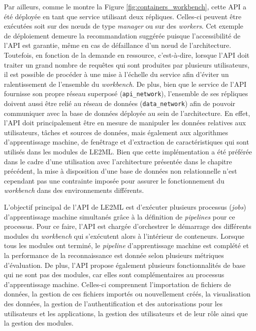 Par ailleurs, comme le montre la Figure \ref{fig:containers_workbench}, cette \acs{API} a été déployée en tant que service utilisant deux répliques. Celles-ci peuvent être exécutées soit sur des n\oe{}uds de type \textit{manager} ou sur des \textit{workers}. Cet exemple de déploiement demeure la recommandation suggérée puisque l'accessibilité de l'\acs{API} est garantie, même en cas de défaillance d'un n\oe{}ud de l'architecture. Toutefois, en fonction de la demande en ressource, c'est-à-dire, lorsque l'\acs{API} doit traiter un grand nombre de requêtes qui sont produites par plusieurs utilisateurs, il est possible de procéder à une mise à l'échelle du service afin d'éviter un ralentissement de l'ensemble du \textit{workbench}. De plus, bien que le service de l'\acs{API} fournisse son propre réseau superposé (\texttt{api\_network}), l'ensemble de ses répliques doivent aussi être relié au réseau de données (\texttt{data\_network}) afin de pouvoir communiquer avec la base de données déployée au sein de l'architecture. En effet, l'\acs{API} doit principalement être en mesure de manipuler les données relatives aux utilisateurs, tâches et sources de données, mais également aux algorithmes d'apprentissage machine, de fenêtrage et d'extraction de caractéristiques qui sont utilisés dans les modules de \acs{LE2ML}. Bien que cette implémentation a été préférée dans le cadre d'une utilisation avec l'architecture présentée dans le chapitre précédent, la mise à disposition d'une base de données non relationnelle n'est cependant pas une contrainte imposée pour assurer le fonctionnement du \textit{workbench} dans des environnements différents.

L'objectif principal de l'\acs{API} de \acs{LE2ML} est d'exécuter plusieurs processus (\emph{jobs}) d'apprentissage machine simultanés grâce à la définition de \textit{pipelines} pour ce processus. Pour ce faire, l'\acs{API} est chargée d'orchestrer le démarrage des différents modules du \textit{workbench} qui s'exécutent alors à l'intérieur de conteneurs. Lorsque tous les modules ont terminé, le \textit{pipeline} d'apprentissage machine est complété et la performance de la reconnaissance est donnée selon plusieurs métriques d'évaluation. De plus, l'\acs{API} propose également plusieurs fonctionnalités de base qui ne sont pas des modules, car elles sont complémentaires au processus d'apprentissage machine. Celles-ci comprennent l'importation de fichiers de données, la gestion de ces fichiers importés ou nouvellement créés, la visualisation des données, la gestion de l'authentification et des autorisations pour les utilisateurs et les applications, la gestion des utilisateurs et de leur rôle ainsi que la gestion des modules.

